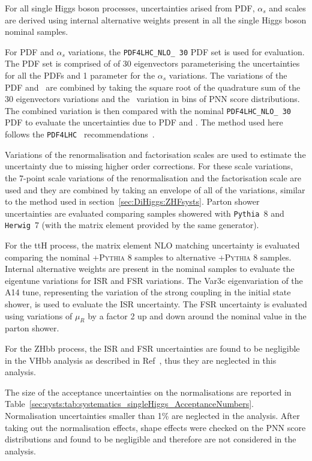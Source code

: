 For all single Higgs boson processes, uncertainties arised from PDF, 
$\alpha_s$ and scales are derived using 
internal alternative weights present in all the single Higgs boson nominal samples. 

For PDF and $\alpha_s$ variations, the 
\texttt{PDF4LHC\_NLO\_ 30} PDF set is used for evaluation.
The PDF set is comprised of of 30 eigenvectors parameterising 
the uncertainties for all the PDFs and 1 parameter for the $\alpha_s$ variations.
The variations of the PDF and \alphas\ are combined by 
taking the square root of the quadrature sum of the 30 eigenvectors variations
and the \alphas\ variation in bins of PNN score distributions.
The combined variation is then compared with the nominal \texttt{PDF4LHC\_NLO\_ 30} PDF
to evaluate the uncertainties due to PDF and \alphas.
The method used here follows the \texttt{PDF4LHC }
recommendations~\cite{Butterworth:2015oua}.

Variations of the renormalisation and factorisation scales
are used to estimate the uncertainty due to missing higher 
order corrections. For these scale variations, 
the 7-point scale variations of the renormalisation
and the factorisation scale are used and they are 
combined by taking an envelope of all of the variations,
similar to the method used in section~\ref{sec:DiHiggs:ZHFsysts}.
Parton shower uncertainties 
are evaluated comparing samples showered with \texttt{Pythia}~8
and \texttt{Herwig}~7 (with the matrix element provided by the same generator). 

For the ttH process,
the matrix element NLO matching uncertainty is evaluated 
comparing the nominal \POWHEG+\textsc{Pythia 8} samples 
to alternative \AMCatNLO+\textsc{Pythia 8} samples. 
Internal alternative weights are 
present in the nominal samples to evaluate the eigentune 
variations for ISR and FSR variations. 
The Var3c eigenvariation of the A14 tune, representing 
the variation of the strong coupling in the initial state shower, 
is used to evaluate the ISR uncertainty. 
The FSR uncertainty is evaluated using variations of $\mu_R$ 
by a factor 2 up and down around the nominal value in the parton shower. 

For the ZHbb process, the
ISR and FSR uncertainties are found to be negligible in the VHbb 
analysis as described in Ref~\cite{AlKhoury:2690042}, 
thus they are neglected in this analysis. 


The size of the acceptance uncertainties on the normalisations 
are reported in Table~\ref{sec:systs:tab:systematics_singleHiggs_AcceptanceNumbers}. 
Normalisation uncertainties smaller than 1\% are neglected in the analysis. 
After taking out the normalisation effects, 
shape effects were checked on the PNN score distributions 
and found to be negligible 
and therefore are not considered in the analysis.


